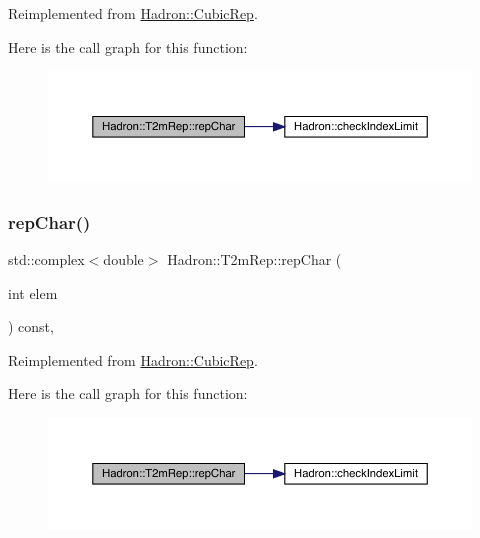 Reimplemented from \mbox{\hyperlink{structHadron_1_1CubicRep_af45227106e8e715e84b0af69cd3b36f8}{Hadron\+::\+Cubic\+Rep}}.

Here is the call graph for this function\+:
\nopagebreak
\begin{figure}[H]
\begin{center}
\leavevmode
\includegraphics[width=350pt]{d7/dc8/structHadron_1_1T2mRep_af6775da2b681eda429dc3a5c026cc877_cgraph}
\end{center}
\end{figure}
\mbox{\label{structHadron_1_1T2mRep_af6775da2b681eda429dc3a5c026cc877}} 
\subsubsection{\texorpdfstring{repChar()}{repChar()}\hspace{0.1cm}{\footnotesize\ttfamily [3/3]}}
{\footnotesize\ttfamily std\+::complex$<$double$>$ Hadron\+::\+T2m\+Rep\+::rep\+Char (\begin{DoxyParamCaption}\item[{int}]{elem }\end{DoxyParamCaption}) const\hspace{0.3cm}{\ttfamily [inline]}, {\ttfamily [virtual]}}



Reimplemented from \mbox{\hyperlink{structHadron_1_1CubicRep_af45227106e8e715e84b0af69cd3b36f8}{Hadron\+::\+Cubic\+Rep}}.

Here is the call graph for this function\+:
\nopagebreak
\begin{figure}[H]
\begin{center}
\leavevmode
\includegraphics[width=350pt]{d7/dc8/structHadron_1_1T2mRep_af6775da2b681eda429dc3a5c026cc877_cgraph}
\end{center}
\end{figure}
\mbox{\label{structHadron_1_1T2mRep_a19df67dde8ae1b7f7436559ee5218f13}} 
